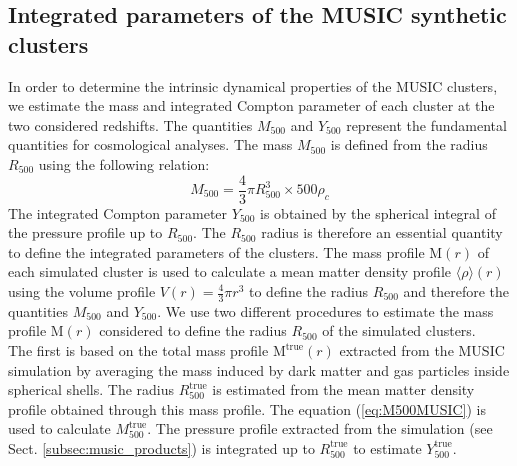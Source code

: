 \documentclass[twocolumn,traditabstract]{aa}
\begin{document}
\subsection{Integrated parameters of the MUSIC synthetic clusters}\label{subsec:music_integ}

In order to determine the intrinsic dynamical properties of the MUSIC clusters, we estimate the mass and integrated Compton parameter of each cluster at the two considered redshifts. The quantities $M_{500}$ and $Y_{500}$ represent the fundamental quantities for cosmological analyses. The mass $M_{500}$ is defined from the radius $R_{500}$ using the following relation:
\begin{equation}
M_{500} = \frac{4}{3}\pi R_{500}^3 \times 500\rho_c
\label{eq:M500MUSIC}
\end{equation}
The integrated Compton parameter $Y_{500}$ is obtained by the spherical integral of the pressure profile up to $R_{500}$. The $R_{500}$ radius is therefore an essential quantity to define the integrated parameters of the clusters. The mass profile $\mathrm{M}(r)$ of each simulated cluster is used to calculate a mean matter density profile $\langle \rho \rangle (r)$ using the volume profile $V(r) = \frac{4}{3}\pi r^3$ to define the radius $R_{500}$ and therefore the quantities $M_{500}$ and $Y_{500}$. We use two different procedures to estimate the mass profile $\mathrm{M}(r)$ considered to define the radius $R_{500}$ of the simulated clusters.\\
The first is based on the total mass profile $\mathrm{M^{true}}(r)$ extracted from the MUSIC simulation by averaging the mass induced by dark matter and gas particles inside spherical shells. The radius $R_{500}^{\mathrm{true}}$ is estimated from the mean matter density profile obtained through this mass profile. The equation (\ref{eq:M500MUSIC}) is used to calculate $M_{500}^{\mathrm{true}}$. The pressure profile extracted from the simulation (see Sect. \ref{subsec:music_products}) is integrated up to $R_{500}^{\mathrm{true}}$ to estimate $Y_{500}^{\mathrm{true}}$.\\
\end{document}
